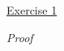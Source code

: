 \noindent
\underline{Exercise 1}
\vspace{2mm}


\vspace{2mm}

\noindent
\emph{Proof}


\vspace{2mm}
